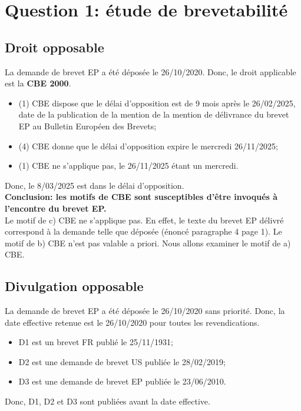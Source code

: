 \section{Question 1: étude de brevetabilité}

\subsection{Droit opposable}

La demande de brevet EP a été déposée le 26/10/2020.
Donc, le droit applicable est la \textbf{CBE 2000}.
\begin{itemize}
  \item {}(1) CBE dispose que le délai d'opposition est de 9 mois après le 26/02/2025, 
  date de la publication de la mention de la mention de délivrance
  du brevet EP au Bulletin Européen des Brevets;
  
  \item {}(4) CBE donne que le délai d'opposition expire le mercredi 26/11/2025;

  \item {}(1) CBE ne s'applique pas, le 26/11/2025 étant un mercredi.
\end{itemize}
Donc, le 8/03/2025 est dans le délai d'opposition.\\

\textbf{Conclusion: les motifs de  CBE sont susceptibles d'être invoqués à l'encontre du brevet EP.}\\

Le motif de c) CBE ne s'applique pas.
En effet, le texte du brevet EP délivré correspond à la demande telle que déposée (énoncé paragraphe 4 page 1).
Le motif de b) CBE n'est pas valable a priori.
Nous allons examiner le motif de a) CBE.

\subsection{Divulgation opposable}

La demande de brevet EP a été déposée le 26/10/2020 sans priorité.
Donc, la date effective retenue est le 26/10/2020 pour toutes les revendications. \\

\begin{itemize}
    \item D1 est un brevet FR publié le 25/11/1931;
    \item D2 est une demande de brevet US publiée le 28/02/2019;
    \item D3 est une demande de brevet EP publiée le 23/06/2010.
\end{itemize}
Donc, D1, D2 et D3 sont publiées avant la date effective.\\

